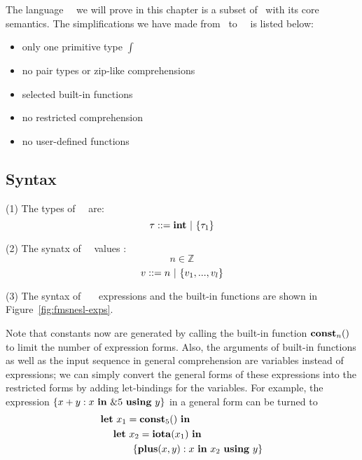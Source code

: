 The language \fmsnesl \  \ we will prove in this chapter is a subset of \mysnesl \ with its core semantics. 
The simplifications we have made from \mysnesl \  to \fmsnesl \  \ is listed below:
\begin{itemize}
	\item only one primitive type $\int$ 
	\item no pair types or zip-like comprehensions
	\item selected built-in functions 
	\item no restricted comprehension
	\item no user-defined functions
\end{itemize}


\subsection{Syntax}

\noindent (1) The types of \fmsnesl \  \ are: 
$$\tau ::= \int \ | \ \tseq{\tau_1}$$

\noindent (2) The synatx of \fmsnesl \  \ values : 
$$ n \in \mathbb{Z} $$
$$ v::= n \ | \ \{\replc{l}{v}\}$$

\noindent (3) The syntax of \fmsnesl \  \  \ expressions and the built-in functions are shown in Figure~\ref{fig:fmsnesl-exps}. 




Note that constants now are generated by calling the built-in function $\constn{n}()$ to limit the number of expression forms.
Also, the arguments of built-in functions as well as the input sequence in general comprehension are variables instead of expressions; we can simply convert the general forms of these expressions into the restricted forms by adding let-bindings for the variables. 
For example, the expression $\Comp{x+y}{x}{\&5}{y}$ in a general form can be turned to
\begin{alignat*}{2}
\*{let} & \ x_1 = \const{5} \ \*{in} \\
& \*{let} \ x_2 =  \iota{x_1} \ \*{in} \\
& \qquad \{ \plus{x}{y} :  x \ \*{in} \ x_2 \ \*{using}  \ y \}
\end{alignat*} 




